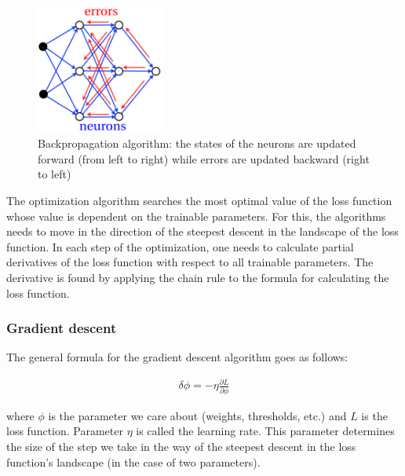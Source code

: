 \vspace{3mm}
\begin{figure}[htb]
	\begin{center}
		\includegraphics*[width=4.2cm, keepaspectratio]{obr/backpropagation.png}
	\end{center}
	\vspace{3mm}
	\caption{Backpropagation algorithm: the states of the neurons are updated forward
		(from left to right) while errors are updated backward (right to left) \cite{mehlig}} 
	\label{backprop}	
\end{figure}


The optimization algorithm searches the most optimal value of the loss function whose value is dependent on the trainable parameters. For this, the algorithms needs to move in the direction of the steepest descent in the landscape of the loss function. In each step of the optimization, one needs to calculate partial derivatives of the loss function with respect to all trainable parameters. The derivative is found by applying the chain rule to the formula for calculating the loss function. \cite{mehlig}

\subsubsection{Gradient descent}

The general formula for the gradient descent algorithm goes as follows: \cite{notes}

\begin{gather}
	\delta \phi = - \eta \frac{\partial L}{\partial \phi}
\end{gather}

\noindent where $ \phi $ is the parameter we care about (weights, thresholds, etc.) and $ L $ is the loss function. Parameter $ \eta $ is called the learning rate. This parameter determines the size of the step we take in the way of the steepest descent in the loss function's landscape (in the case of two parameters). \cite{notes}

